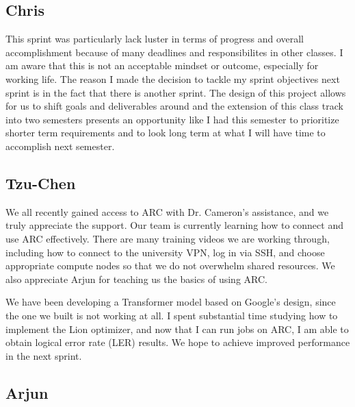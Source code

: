 \documentclass[12pt]{article}
\begin{document}
\subsection*{Chris}

This sprint was particularly lack luster in terms of progress and overall accomplishment because of 
many deadlines and responsibilites in other classes. I am aware that this is not an acceptable mindset 
or outcome, especially for working life. The reason I made the decision to tackle my sprint objectives 
next sprint is in the fact that there is another sprint. The design of this project allows for us to 
shift goals and deliverables around and the extension of this class track into two semesters presents an 
opportunity like I had this semester to prioritize shorter term requirements and to look long term at what 
I will have time to accomplish next semester.

\subsection*{Tzu-Chen}

We all recently gained access to ARC with Dr. Cameron’s assistance, 
and we truly appreciate the support. Our team is currently 
learning how to connect and use ARC effectively. There are many training 
videos we are working through, including how to connect to the university 
VPN, log in via SSH, and choose appropriate compute nodes so that we do 
not overwhelm shared resources. We also appreciate Arjun for teaching 
us the basics of using ARC.

We have been developing a Transformer model based on Google’s design, 
since the one we built is not working at all. I spent substantial time 
studying how to implement the Lion optimizer, and now that I can run jobs 
on ARC, I am able to obtain logical error rate (LER) results. We hope 
to achieve improved performance in the next sprint.


\subsection*{Arjun}
\end{document}
